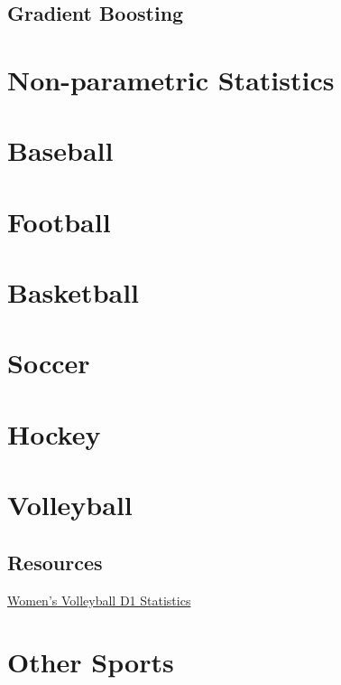 \documentclass[
]{book}
\theoremstyle{definition}
\theoremstyle{definition}
\theoremstyle{definition}
\theoremstyle{definition}
\theoremstyle{remark}
\begin{document}
\hypertarget{gradient-boosting}{%
\section{Gradient Boosting}\label{gradient-boosting}}

\hypertarget{non-parametric-statistics}{%
\chapter{Non-parametric Statistics}\label{non-parametric-statistics}}

\hypertarget{baseball-1}{%
\chapter{Baseball}\label{baseball-1}}

\hypertarget{football-1}{%
\chapter{Football}\label{football-1}}

\hypertarget{basketball-1}{%
\chapter{Basketball}\label{basketball-1}}

\hypertarget{soccer-1}{%
\chapter{Soccer}\label{soccer-1}}

\hypertarget{hockey-1}{%
\chapter{Hockey}\label{hockey-1}}

\hypertarget{volleyball-1}{%
\chapter{Volleyball}\label{volleyball-1}}

\hypertarget{resources}{%
\section{Resources}\label{resources}}

\href{https://www.ncaa.com/stats/volleyball-women/d1}{Women's Volleyball D1 Statistics}

\hypertarget{other-sports}{%
\chapter{Other Sports}\label{other-sports}}
\end{document}
